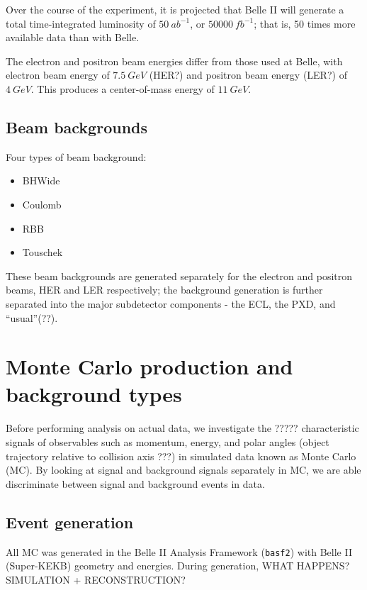 \documentclass[12pt,a4paper]{article} %
\begin{document}
Over the course of the experiment, it is projected that Belle II will generate a total time-integrated luminosity of $\SI{50}{ab^{-1}}$, or $\SI{50000}{fb^{-1}}$; that is, 50 times more available data than with Belle.

The electron and positron beam energies differ from those used at Belle, with electron beam energy of $\SI{7.5}{GeV}$ (HER?) and positron beam energy (LER?) of $\SI{4}{GeV}$. This produces a center-of-mass energy of $\SI{11}{GeV}$.



\subsection{Beam backgrounds}

Four types of beam background:
\begin{itemize}
\item BHWide
\item Coulomb
\item RBB
\item Touschek
\end{itemize}

These beam backgrounds are generated separately for the electron and positron beams, HER and LER respectively; the background generation is further separated into the major subdetector components - the ECL, the PXD, and ``usual''(??).




\pagebreak

\section{Monte Carlo production and background types}

Before performing analysis on actual data, we investigate the ????? characteristic signals of observables such as momentum, energy, and polar angles (object trajectory relative to collision axis ???) in simulated data known as Monte Carlo (MC). By looking at signal and background signals separately in MC, we are able discriminate between signal and background events in data.

\subsection{Event generation}

All MC was generated in the Belle II Analysis Framework (\texttt{basf2}) with Belle II (Super-KEKB) geometry and energies. During generation, WHAT HAPPENS? SIMULATION + RECONSTRUCTION?
\end{document}
